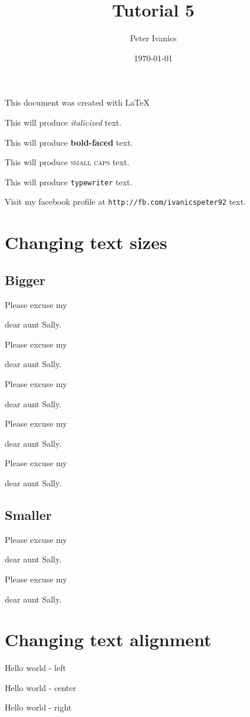 \documentclass[11]{article}
\begin{document}
	\tableofcontents

	\title{Tutorial 5}
	\author{Peter Ivanics}
	\date{\today}
	\maketitle
	
	\begin{center}
		This document was 	created with \LaTeX
	\end{center}	 
	
	This will produce \textit{italicized} text. 
	
	This will produce \textbf{bold-faced} text. 
	
	This will produce \textsc{small caps} text.
	 
	This will produce \texttt{typewriter} text. 
	
	Visit my facebook profile at \texttt{http://fb.com/ivanicspeter92} text. 
	
	\section{Changing text sizes}
		\subsection{Bigger}
		Please excuse my \begin{large}dear aunt Sally.\end{large}
	
		Please excuse my \begin{Large}dear aunt Sally.\end{Large}
	
		Please excuse my \begin{LARGE}dear aunt Sally.\end{LARGE}
	
		Please excuse my \begin{huge}dear aunt Sally.\end{huge}
	
		Please excuse my \begin{Huge}dear aunt Sally.\end{Huge}
	\subsection{Smaller}
	
		Please excuse my \begin{small}dear aunt Sally.\end{small}
	
		Please excuse my \begin{tiny}dear aunt Sally.\end{tiny} 
	
	\section{Changing text alignment}
	
	\begin{flushleft}Hello world - left\end{flushleft}
	\begin{center}Hello world - center\end{center}
	\begin{flushright}Hello world - right\end{flushright}
\end{document}
